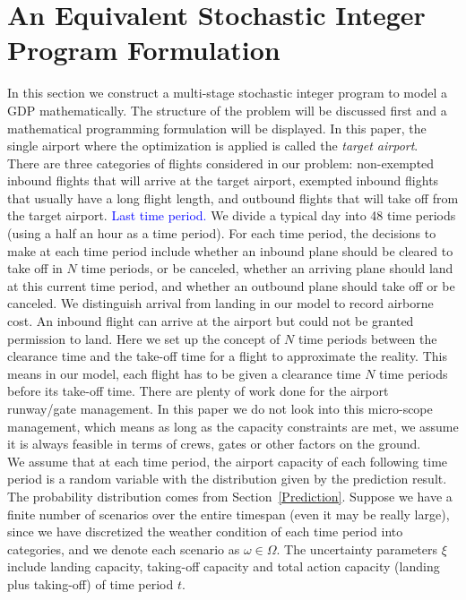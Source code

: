 \documentclass[12pt]{article}
\begin{document}
\section{An Equivalent Stochastic Integer Program Formulation}\label{Model}
	In this section we construct a multi-stage stochastic integer program to model a GDP mathematically. The structure of the problem will be discussed first and a mathematical programming formulation will be displayed. In this paper, the single airport where the optimization is applied is called the {\em target airport}.\\
	\newline There are three categories of flights considered in our problem: non-exempted inbound flights that will arrive at the target airport, exempted inbound flights that usually have a long flight length, and outbound flights that will take off from the target airport. \textcolor{blue}{Last time period.} We divide a typical day into 48 time periods (using a half an hour as a time period). For each time period, the decisions to make at each time period include whether an inbound plane should be cleared to take off in \(N\) time periods, or be canceled, whether an arriving plane should land at this current time period, and whether an outbound plane should take off or be canceled. We distinguish  arrival from landing in our model to record airborne cost. An inbound flight can arrive at the airport but could not be granted permission to land. Here we set up the concept of \(N\) time periods between the clearance time and the take-off time for a flight to approximate the reality. This means in our model, each flight has to be given a clearance time \(N\) time periods before its take-off time. There are plenty of work done for the airport runway/gate management. In this paper we do not look into this micro-scope management, which means as long as the capacity constraints are met, we assume it is always feasible in terms of crews, gates or other factors on the ground.\\
	\newline %
	We assume that at each time period, the airport capacity of each following time period is a random variable with the distribution given by the prediction result. The probability distribution comes from Section~\ref{Prediction}. Suppose we have a finite number of scenarios over the entire timespan (even it may be really large), since we have discretized the weather condition of each time period into categories, and we denote each scenario as \(\omega \in \Omega\). The uncertainty parameters \(\xi\) include landing capacity, taking-off capacity and total action capacity (landing plus taking-off) of time period \(t\). \\
\end{document}
